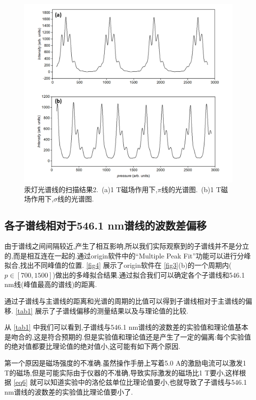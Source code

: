 \documentclass[font=default]{mpltx}
\begin{document}
\begin{figure}
  \centering
  \includegraphics[width=0.9\linewidth]{fig/data2.png}
  \caption{汞灯光谱线的扫描结果2.\ (a)1 T磁场作用下,$\pi$线的光谱图.\ (b)1 T磁场作用下,$\sigma$线的光谱图.}
  \label{fig5}
\end{figure}
\subsection{各子谱线相对于546.1 nm谱线的波数差偏移}\label{deviation}

由于谱线之间间隔较近,产生了相互影响,所以我们实际观察到的子谱线并不是分立的,而是相互连在一起的.通过origin软件中的``Multiple Peak Fit''功能可以进行分峰拟合,找出不同峰值的位置. \autoref{fig4} 展示了origin软件在 \autoref{fig3}(b)的一个周期内($p\in[700,1500]$)做出的多峰拟合结果.通过拟合我们可以确定各个子谱线和546.1 nm线(峰值最高的谱线)的距离.

通过子谱线与主谱线的距离和光谱的周期的比值可以得到子谱线相对于主谱线的偏移. \autoref{tab1} 展示了子谱线偏移的测量结果以及与理论值的比较.

从 \autoref{tab1} 中我们可以看到,子谱线与546.1 nm谱线的波数差的实验值和理论值基本是吻合的,这是符合预期的.但是实验值和理论值还是产生了一定的偏离:每个实验值的绝对值都要比理论值的绝对值小,这可能有如下两个原因.

第一个原因是磁场强度的不准确.虽然操作手册上写着5.0 A的激励电流可以激发1 T的磁场,但是可能实际由于仪器的不准确,导致实际激发的磁场比1 T要小,这样根据 \autoref{eq6} 就可以知道实验中的洛伦兹单位比理论值要小,也就导致了子谱线与546.1 nm谱线的波数差的实验值比理论值要小了.
\end{document}
